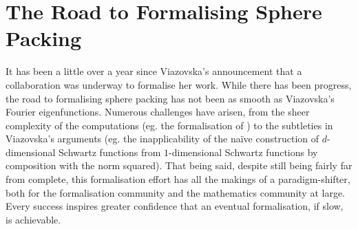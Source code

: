 \section{The Road to Formalising Sphere Packing}

It has been a little over a year since Viazovska's announcement that a collaboration was underway to formalise her work. While there has been progress, the road to formalising sphere packing has not been as smooth as Viazovska's Fourier eigenfunctions. Numerous challenges have arisen, from the sheer complexity of the computations (eg. the formalisation of ) to the subtleties in Viazovska's arguments (eg. the inapplicability of the naïve construction of $d$-dimensional Schwartz functions from $1$-dimensional Schwartz functions by composition with the norm squared). That being said, despite still being fairly far from complete, this formalisation effort has all the makings of a paradigm-shifter, both for the formalisation community and the mathematics community at large. Every success inspires greater confidence that an eventual formalisation, if slow, is achievable.

